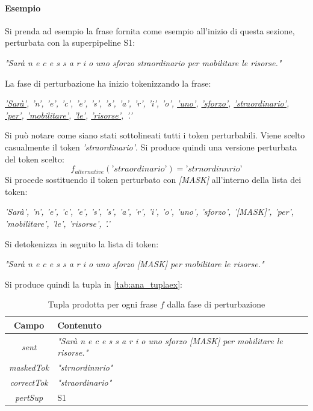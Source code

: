 \paragraph{Esempio} Si prenda ad esempio la frase fornita come esempio all'inizio di questa sezione, perturbata con la superpipeline S1:
\begin{center}
\textit{"Sarà n e c e s s a r i o uno sforzo straordinario per mobilitare le risorse."}
\end{center}
La fase di perturbazione ha inizio tokenizzando la frase:
\begin{center}
\textit{\underline{'Sarà'}, 'n', 'e', 'c', 'e', 's', 's', 'a', 'r', 'i', 'o', \underline{'uno'}, \underline{'sforzo'}, \underline{'straordinario'}, \underline{'per'}, \underline{'mobilitare'}, \underline{'le'}, \underline{'risorse'}, '.'}
\end{center}
Si può notare come siano stati sottolineati tutti i token perturbabili. Viene scelto casualmente il token \textit{'straordinario'}. Si produce quindi una versione perturbata del token scelto:
\begin{equation}
f_{alternative}(\textit{'straordinario'}) =  \textit{'strnordinnrio'}
\end{equation}
Si procede sostituendo il token perturbato con \textit{[MASK]} all'interno della lista dei token:
\begin{center}
\textit{'Sarà', 'n', 'e', 'c', 'e', 's', 's', 'a', 'r', 'i', 'o', 'uno', 'sforzo', '[MASK]', 'per', 'mobilitare', 'le', 'risorse', '.'}
\end{center}
Si detokenizza in seguito la lista di token:
\begin{center}
\textit{"Sarà n e c e s s a r i o uno sforzo [MASK] per mobilitare le risorse."}
\end{center}
Si produce quindi la tupla in \autoref{tab:ana_tuplaex}:
\begin{table}[H]
\centering
\begin{tabular}{cp{12cm}}
\textbf{Campo} & \textbf{Contenuto}\\ \hline
\textit{sent} & \textit{"Sarà n e c e s s a r i o uno sforzo [MASK] per mobilitare le risorse."}\\
\textit{maskedTok} & \textit{"strnordinnrio"}\\
\textit{correctTok} & \textit{"straordinario"}\\
\textit{pertSup} & S1 \\
\end{tabular}
\caption{Tupla prodotta per ogni frase $f$ dalla fase di perturbazione}
\label{tab:ana_tuplaex}
\end{table}


